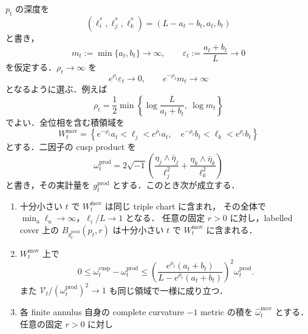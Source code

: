 \begin{lemma}
\label{coarse:lem:moving-product-domain}
$p_t$ の深度を
\[
 (\ell_i^*,\ell_j^*,\ell_k^*)=(L-a_t-b_t,a_t,b_t)
\]
と書き，
\begin{equation}\label{coarse:eq:moving-product-sector-assumptions}
 m_t:=\min\{a_t,b_t\}\longrightarrow\infty,
 \qquad \varepsilon_t:=\frac{a_t+b_t}{L}\longrightarrow0
\end{equation}
を仮定する．$\rho_t\to\infty$ を
\begin{equation}\label{coarse:eq:moving-product-radii}
 e^{\rho_t}\varepsilon_t\longrightarrow0,
 \qquad e^{-\rho_t}m_t\longrightarrow\infty
\end{equation}
となるように選ぶ．例えば
\[
 \rho_t=\frac12\min\left\{
       \log\frac{L}{a_t+b_t},\ \log m_t\right\}
\]
でよい．全位相を含む積領域を
\begin{equation}\label{coarse:eq:moving-product-window}
 W_t^{\mathrm{mov}}
 =\left\{e^{-\rho_t}a_t<\ell_j<e^{\rho_t}a_t,\quad
          e^{-\rho_t}b_t<\ell_k<e^{\rho_t}b_t\right\}
\end{equation}
とする．二因子の cusp product を
\begin{equation}\label{coarse:eq:moving-cusp-product}
 \omega_t^{\mathrm{prod}}
 =2\sqrt{-1}\left(
       \frac{\eta_j\wedge\bar\eta_j}{\ell_j^2}
       +\frac{\eta_k\wedge\bar\eta_k}{\ell_k^2}\right)
\end{equation}
と書き，その実計量を $g_t^{\mathrm{prod}}$ とする．このとき次が成立する．
\begin{enumerate}[label=\textup{(M\arabic*)}]
\item 十分小さい $t$ で $\overline{W_t^{\mathrm{mov}}}$ は同じ triple chart に含まれ，
その全体で $\min_a\ell_a\to\infty$，$\ell_i/L\to1$ となる．
任意の固定 $r>0$ に対し，labelled cover 上の
$B_{g_t^{\mathrm{prod}}}(p_t,r)$ は十分小さい $t$ で $W_t^{\mathrm{mov}}$ に含まれる．
\item $W_t^{\mathrm{mov}}$ 上で
\begin{equation}\label{coarse:eq:moving-cusp-tensor-error}
 0\le\omega_t^{\mathrm{cusp}}-\omega_t^{\mathrm{prod}}
 \le
 \left(\frac{e^{\rho_t}(a_t+b_t)}
 {L-e^{\rho_t}(a_t+b_t)}\right)^2\omega_t^{\mathrm{prod}}.
\end{equation}
また $\mathcal V_t/(\omega_t^{\mathrm{prod}})^2\to1$ も同じ領域で一様に成り立つ．
\item 各 finite annulus 自身の complete curvature $-1$ metric の積を
$\widehat\omega_t^{\mathrm{mov}}$ とする．任意の固定 $r>0$ に対し

\end{enumerate}
\end{lemma}
